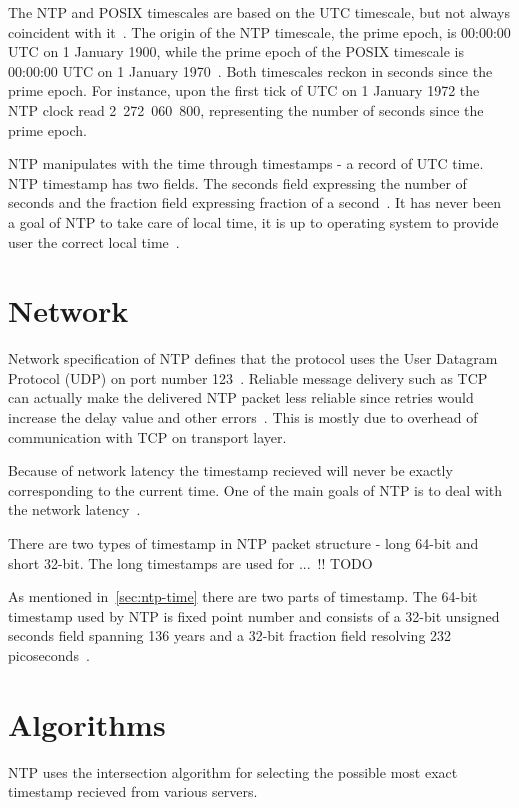 The NTP and POSIX timescales are based on the UTC timescale,
but not always coincident with it~\cite{ntp-leap}.
The origin of the NTP timescale, the prime epoch, is 00:00:00 UTC on 1 January 1900,
while the prime epoch of the POSIX timescale is 00:00:00 UTC on 1 January 1970~\cite{ntp-leap}.
Both timescales reckon in seconds since the prime epoch.
For instance, upon the first tick of UTC on 1 January 1972 the NTP clock read 2~272~060~800,
representing the number of seconds since the prime epoch.

NTP manipulates with the time through timestamps - a record of UTC time.
NTP timestamp has two fields. The seconds field expressing the number of seconds
and the fraction field expressing fraction of a second~\cite{rfc5905}.
It has never been a goal of NTP to take care of local time,
it is up to operating system to provide user the correct local time~\cite{ntp-overview}.

\section{Network}\label{sec:ntp-network}
Network specification of NTP defines that
the protocol uses the User Datagram Protocol (UDP) on port number 123~\cite{rfc5905, ianna-ports}.
Reliable message delivery such as TCP can actually make the delivered NTP packet less reliable since retries
would increase the delay value and other errors~\cite{rfc5905}.
This is mostly due to overhead of communication with TCP on transport layer.

Because of network latency the timestamp recieved will never be exactly corresponding to
the current time.
One of the main goals of NTP is to deal with the network latency~\cite{ntp-overview}.

There are two types of timestamp in NTP packet structure -
long 64-bit and short 32-bit.
The long timestamps are used for ... \!!! TODO

As mentioned in~\ref{sec:ntp-time} there are two parts of timestamp.
The 64-bit timestamp used by NTP is fixed point number and consists of a 32-bit unsigned seconds
field spanning 136 years and a 32-bit fraction field resolving 232
picoseconds~\cite{rfc5905}.

\section{Algorithms}
NTP uses the intersection algorithm for selecting the possible most exact timestamp recieved
from various servers.
